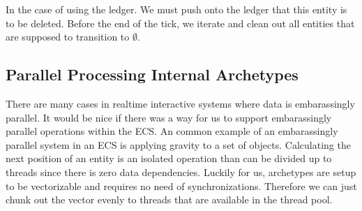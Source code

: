 In the case of using the ledger. We must push onto the ledger that this entity is to be deleted. Before the end of the tick, we iterate and clean out all entities that are supposed to transition to $\emptyset$. 

\subsection{Parallel Processing Internal Archetypes}
There are many cases in realtime interactive systems where data is embarassingly parallel. It would be nice if there was a way for us to support embarassingly parallel operations within the ECS. An common example of an embarassingly parallel system in an ECS is applying gravity to a set of objects. Calculating the next position of an entity is an isolated operation than can be divided up to threads since there is zero data dependencies. Luckily for us, archetypes are setup to be vectorizable and requires no need of synchronizations. Therefore we can just chunk out the vector evenly to threads that are available in the thread pool.